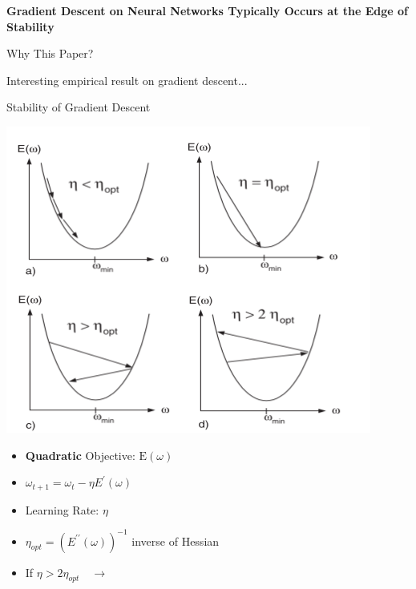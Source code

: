\documentclass[aspectratio=169]{beamer}
\author{\authorlabel}
\newcommand{\mysubtitle}{\color{Pink}\Large{\textbf{Gradient Descent on Neural Networks Typically Occurs at the Edge of Stability}}}
\begin{document}



\begin{frame}
	\centering
	\mysubtitle\cite{Cohen2021}
\end{frame}

\begin{frame}{Why This Paper?}
	\centering
	\begin{minipage}{0.8\textwidth}
			\centering
			 Interesting empirical result on gradient descent...
	\end{minipage}
\end{frame}

\begin{frame}{Stability of Gradient Descent}
	\begin{minipage}{0.5\textwidth}
    \centering
    \includegraphics[width=0.9\textwidth]{Figures/GD.png}\cite{Orr1998}
	\end{minipage}%
	\begin{minipage}{0.5\textwidth}
    \begin{itemize}
      \item \textbf{Quadratic} Objective: $\text{E}(\omega)$
      \item $\omega_{t+1} = \omega_{t} - \eta E^\prime(\omega)$
      \item Learning Rate: $\eta$
      \item $\eta_{opt}=(E^{\prime\prime}(\omega))^{-1}$ inverse of Hessian
      \item If $\eta>2\eta_{opt}\quad\to$ \color{Pink}{Divergence}
    \end{itemize}
	\end{minipage}
\end{frame}
\end{document}
